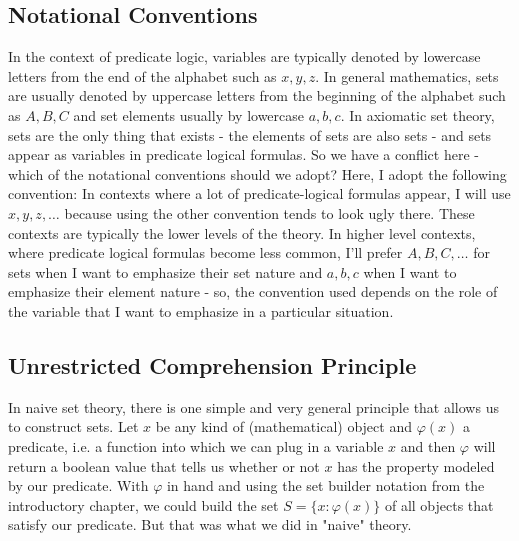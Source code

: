 \subsection{Notational Conventions}  In the context of predicate logic, variables are typically denoted by lowercase letters from the end of the alphabet such as $x,y,z$. In general mathematics, sets are usually denoted by uppercase letters from the beginning of the alphabet such as $A,B,C$ and set elements usually by lowercase $a,b,c$. In axiomatic set theory, sets are the only thing that exists - the elements of sets are also sets - and sets appear as variables in predicate logical formulas. So we have a conflict here - which of the notational conventions should we adopt? Here, I adopt the following convention: In contexts where a lot of predicate-logical formulas appear, I will use $x,y,z, \ldots$ because using the other convention tends to look ugly there. These contexts are typically the lower levels of the theory. In higher level contexts, where predicate logical formulas become less common, I'll prefer  $A,B,C, \ldots$ for sets when I want to emphasize their set nature and $a,b,c$ when I want to emphasize their element nature - so, the convention used depends on the role of the variable that I want to emphasize in a particular situation.

\subsection{Unrestricted Comprehension Principle}
In naive set theory, there is one simple and very general principle that allows us to construct sets. Let $x$ be any kind of (mathematical) object and $\varphi(x)$ a predicate, i.e. a function into which we can plug in a variable $x$ and then $\varphi$ will return a boolean value that tells us whether or not $x$ has the property modeled by our predicate. With $\varphi$ in hand and using the set builder notation from the introductory chapter, we could build the set $S = \{x: \varphi(x)\}$ of all objects that satisfy our predicate. But that was what we did in "naive" theory.


